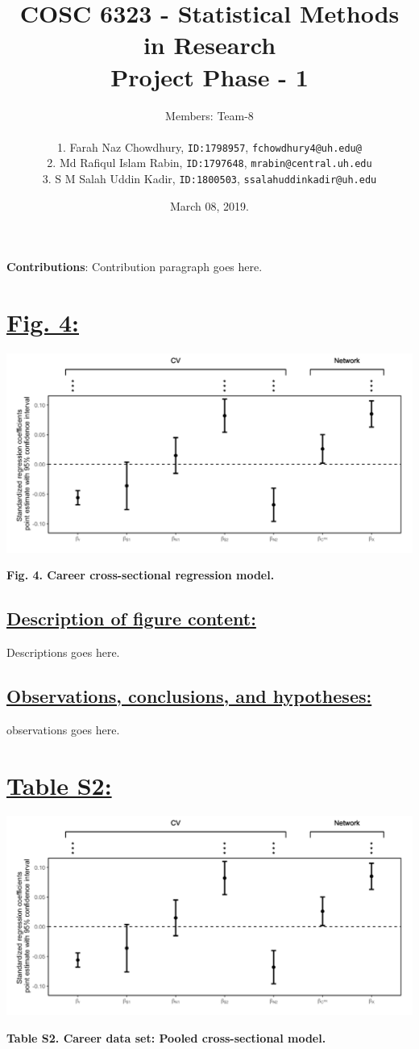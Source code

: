 \documentclass{article}\usepackage[]{graphicx}\usepackage[]{color}
\title{COSC 6323 - Statistical Methods in Research\\Project Phase - 1\\}
\author{%
    Members: Team-8 \\\\
    1. Farah Naz Chowdhury, \texttt  {ID:1798957}, \texttt{fchowdhury4@uh.edu@}\vspace{2pt} \\
    2. Md Rafiqul Islam Rabin, \texttt{ID:1797648}, \texttt{mrabin@central.uh.edu}\vspace{2pt} \\
    3. S M Salah Uddin Kadir, \texttt{ID:1800503}, \texttt{ssalahuddinkadir@uh.edu}\vspace{2pt} \\
}
\date{March 08, 2019.}
\begin{document}
\maketitle
\par{\textbf{Contributions}: Contribution paragraph goes here.}

\newpage
\section*{\underline{Fig. 4:}}
\begin{center}
\includegraphics[scale=0.5]{4.png}
\newline
\par{\textbf{Fig. 4. Career cross-sectional regression model.}}
\end{center}
\subsection*{\underline{Description of figure content:}}
\par{
Descriptions goes here.
}
\subsection*{\underline{Observations, conclusions, and hypotheses:}}
\par{
observations goes here.
}

\newpage
\section*{\underline{Table S2:}}
\begin{center}
\includegraphics[scale=0.5]{4.png}
\newline
\par{\textbf{Table S2. Career data set: Pooled cross-sectional model.}}
\end{center}
\end{document}
